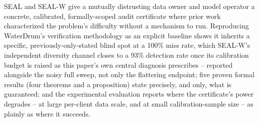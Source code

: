 \documentclass[10pt,journal,compsoc]{IEEEtran}
\begin{document}
SEAL and SEAL-W give a mutually distrusting data owner and model operator a concrete, calibrated, formally-scoped audit certificate where prior work characterized the problem's difficulty without a mechanism to run. Reproducing WaterDrum's verification methodology as an explicit baseline shows it inherits a specific, previously-only-stated blind spot at a 100\% miss rate, which SEAL-W's independent diversity channel closes to a 93\% detection rate once its calibration budget is raised as this paper's own central diagnosis prescribes -- reported alongside the noisy full sweep, not only the flattering endpoint; five proven formal results (four theorems and a proposition) state precisely, and only, what is guaranteed; and the experimental evaluation reports where the certificate's power degrades -- at large per-client data scale, and at small calibration-sample size -- as plainly as where it succeeds.



\end{document}
